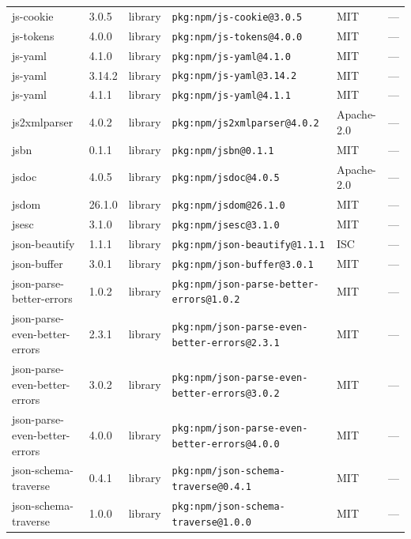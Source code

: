 \documentclass[11pt,a4paper]{article}
\begin{document}
\begin{longtable}{|p{4cm}|p{2cm}|p{1.6cm}|p{5cm}|p{1.5cm}|p{3.5cm}|}
\raggedright js-cookie & 3.0.5 & library & \small\texttt{pkg:npm/js-cookie@3.0.5} & MIT & \small — \\
\raggedright js-tokens & 4.0.0 & library & \small\texttt{pkg:npm/js-tokens@4.0.0} & MIT & \small — \\
\raggedright js-yaml & 4.1.0 & library & \small\texttt{pkg:npm/js-yaml@4.1.0} & MIT & \small — \\
\raggedright js-yaml & 3.14.2 & library & \small\texttt{pkg:npm/js-yaml@3.14.2} & MIT & \small — \\
\raggedright js-yaml & 4.1.1 & library & \small\texttt{pkg:npm/js-yaml@4.1.1} & MIT & \small — \\
\raggedright js2xmlparser & 4.0.2 & library & \small\texttt{pkg:npm/js2xmlparser@4.0.2} & Apache-2.0 & \small — \\
\raggedright jsbn & 0.1.1 & library & \small\texttt{pkg:npm/jsbn@0.1.1} & MIT & \small — \\
\raggedright jsdoc & 4.0.5 & library & \small\texttt{pkg:npm/jsdoc@4.0.5} & Apache-2.0 & \small — \\
\raggedright jsdom & 26.1.0 & library & \small\texttt{pkg:npm/jsdom@26.1.0} & MIT & \small — \\
\raggedright jsesc & 3.1.0 & library & \small\texttt{pkg:npm/jsesc@3.1.0} & MIT & \small — \\
\raggedright json-beautify & 1.1.1 & library & \small\texttt{pkg:npm/json-beautify@1.1.1} & ISC & \small — \\
\raggedright json-buffer & 3.0.1 & library & \small\texttt{pkg:npm/json-buffer@3.0.1} & MIT & \small — \\
\raggedright json-parse-better-errors & 1.0.2 & library & \small\texttt{pkg:npm/json-parse-better-errors@1.0.2} & MIT & \small — \\
\raggedright json-parse-even-better-errors & 2.3.1 & library & \small\texttt{pkg:npm/json-parse-even-better-errors@2.3.1} & MIT & \small — \\
\raggedright json-parse-even-better-errors & 3.0.2 & library & \small\texttt{pkg:npm/json-parse-even-better-errors@3.0.2} & MIT & \small — \\
\raggedright json-parse-even-better-errors & 4.0.0 & library & \small\texttt{pkg:npm/json-parse-even-better-errors@4.0.0} & MIT & \small — \\
\raggedright json-schema-traverse & 0.4.1 & library & \small\texttt{pkg:npm/json-schema-traverse@0.4.1} & MIT & \small — \\
\raggedright json-schema-traverse & 1.0.0 & library & \small\texttt{pkg:npm/json-schema-traverse@1.0.0} & MIT & \small — \\

\end{longtable}
\end{document}
